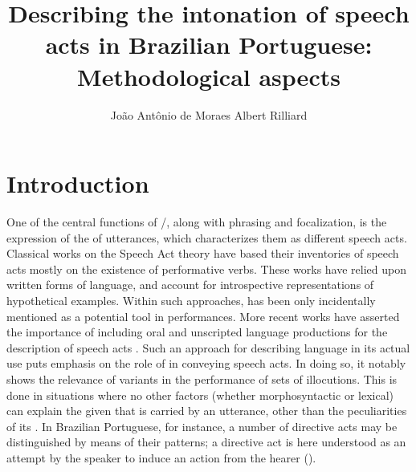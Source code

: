 \documentclass[output=paper]{LSP/langsci}
\author{João Antônio de Moraes\affiliation{Universidade Federal do Rio de Janeiro, CNPq}\lastand 
Albert Rilliard\affiliation{LIMSI, CNRS, Université Paris-Saclay}
}
\title{Describing the intonation of speech acts in Brazilian Portuguese: Methodological aspects}
\begin{document}
\label{chap:mor}\label{ch:7}

\section{Introduction} 
\label{introduction}



One of the central functions of /, along with phrasing and focalization, is the expression of the  of utterances, which characterizes them as different speech acts. 
Classical works on the Speech Act theory \citep{Austin1962,Searle1969,Vanderveken1990,Alston2000} have based their inventories of speech acts mostly on the existence of performative verbs. 
These works have relied upon written forms of language, and account for introspective representations of hypothetical examples. 
Within such approaches,  has been only incidentally mentioned as a potential tool in  performances. 
More recent works have asserted the importance of including oral and unscripted language productions for the description of speech acts \citep{Cresti2000,Moneglia2011,Raso2012,TamotoAndKawabata}.  
Such an approach for describing language in its actual use puts emphasis on the role of  in conveying speech acts. 
In doing so, it notably shows the relevance of  variants in the performance of sets of illocutions. 
This is done in situations where no other factors (whether morphosyntactic or lexical) can explain the given  that is carried by an utterance, other than the peculiarities of its .
In Brazilian Portuguese, for instance, a number of directive acts may be distinguished by means of their  patterns; a directive act is here understood as an attempt by the speaker to induce an action from the hearer (\citealt{Searle1979}).%
\end{document}
